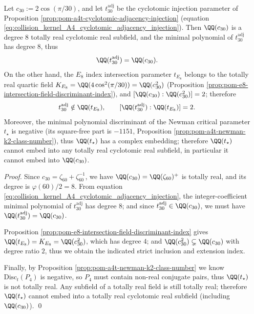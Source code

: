 \begin{corollary}\label{cor:pom-a4t-e8-two-resolution-layer-nonembedding}
Let \(c_{30}:=2\cos(\pi/30)\), and let \(t_{30}^{\mathrm{adj}}\) be the cyclotomic injection parameter of Proposition \ref{prop:pom-a4t-cyclotomic-adjacency-injection} (equation \eqref{eq:collision_kernel_A4_cyclotomic_adjacency_injection}).
Then \(\QQ(c_{30})\) is a degree \(8\) totally real cyclotomic real subfield, and the minimal polynomial of \(t_{30}^{\mathrm{adj}}\) has degree \(8\), thus
\[
\QQ(t_{30}^{\mathrm{adj}})=\QQ(c_{30}).
\]
On the other hand, the \(E_8\) index intersection parameter \(t_{E_8}\) belongs to the totally real quartic field \(K_{E_8}=\QQ(4\cos^2(\pi/30))=\QQ(c_{30}^2)\) (Proposition \ref{prop:pom-e8-intersection-field-discriminant-index}), and \([\QQ(c_{30}):\QQ(c_{30}^2)]=2\);
therefore
\[
t_{30}^{\mathrm{adj}}\notin \QQ(t_{E_8}),
\qquad
[\QQ(t_{30}^{\mathrm{adj}}):\QQ(t_{E_8})]=2.
\]
Moreover, the minimal polynomial discriminant of the Newman critical parameter \(t_\star\) is negative (its square-free part is \(-1151\), Proposition \ref{prop:pom-a4t-newman-k2-class-number}), thus \(\QQ(t_\star)\) has a complex embedding; therefore \(\QQ(t_\star)\) cannot embed into any totally real cyclotomic real subfield, in particular it cannot embed into \(\QQ(c_{30})\).
\end{corollary}
\begin{proof}
Since \(c_{30}=\zeta_{60}+\zeta_{60}^{-1}\), we have \(\QQ(c_{30})=\QQ(\zeta_{60})^+\) is totally real, and its degree is \(\varphi(60)/2=8\).
From equation \eqref{eq:collision_kernel_A4_cyclotomic_adjacency_injection}, the integer-coefficient minimal polynomial of \(t_{30}^{\mathrm{adj}}\) has degree \(8\); and since \(t_{30}^{\mathrm{adj}}\in\QQ(c_{30})\), we must have \(\QQ(t_{30}^{\mathrm{adj}})=\QQ(c_{30})\).
\par
Proposition \ref{prop:pom-e8-intersection-field-discriminant-index} gives \(\QQ(t_{E_8})=K_{E_8}=\QQ(c_{30}^2)\), which has degree \(4\); and \(\QQ(c_{30}^2)\subsetneq\QQ(c_{30})\) with degree ratio \(2\), thus we obtain the indicated strict inclusion and extension index.
\par
Finally, by Proposition \ref{prop:pom-a4t-newman-k2-class-number} we know \(\mathrm{Disc}_t(P_4)\) is negative, so \(P_4\) must contain non-real conjugate pairs, thus \(\QQ(t_\star)\) is not totally real.
Any subfield of a totally real field is still totally real; therefore \(\QQ(t_\star)\) cannot embed into a totally real cyclotomic real subfield (including \(\QQ(c_{30})\)). \qed
\end{proof}

